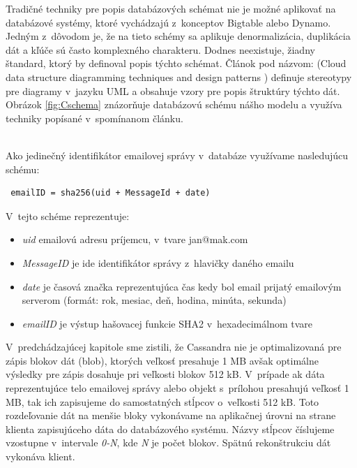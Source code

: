 \documentclass[11pt,twoside,a4paper]{book}
\begin{document}
Tradičné techniky pre popis databázových schémat nie je možné aplikovať na databázové systémy, ktoré vychádzajú z~konceptov Bigtable alebo Dynamo. Jedným z~dôvodom je, že na tieto schémy sa aplikuje denormalizácia, duplikácia dát a kľúče sú často komplexného charakteru. Dodnes neexistuje, žiadny štandard, ktorý by definoval popis týchto schémat. Článok pod názvom:  (Cloud data structure diagramming techniques and design patterns \cite{CloudDataStructureDiag}) definuje stereotypy pre diagramy v~jazyku UML a obsahuje vzory pre popis štruktúry týchto dát. Obrázok \ref{fig:Cschema} znázorňuje databázovú schému nášho modelu a využíva techniky popísané v~spomínanom článku.

\noindent
\\
Ako jedinečný identifikátor emailovej správy v~databáze využívame nasledujúcu schému:
\begin{verbatim}
 emailID = sha256(uid + MessageId + date)
\end{verbatim}

\noindent
V~tejto schéme reprezentuje:
\begin{itemize}
 \item \emph{uid} emailovú adresu príjemcu, v~tvare jan@mak.com
 \item \emph{MessageID} je ide identifikátor správy z~hlavičky daného emailu
 \item \emph{date} je časová značka reprezentujúca čas kedy bol email prijatý emailovým serverom (formát: rok, mesiac, deň, hodina, minúta, sekunda)
 \item \emph{emailID} je výstup hašovacej funkcie SHA2 v~hexadecimálnom tvare
\end{itemize}


V~predchádzajúcej kapitole sme zistili, že Cassandra nie je optimalizovaná pre zápis blokov dát (blob), ktorých veľkosť presahuje 1 MB avšak optimálne výsledky pre zápis dosahuje pri veľkosti blokov 512 kB. V~prípade ak dáta reprezentujúce telo emailovej správy alebo objekt s~prílohou presahujú veľkosť 1 MB, tak ich zapisujeme do samostatných stĺpcov o~veľkosti 512 kB. Toto rozdeľovanie dát na menšie bloky vykonávame na aplikačnej úrovni na strane klienta zapisujúceho dáta do databázového systému. Názvy stĺpcov číslujeme vzostupne v~intervale \emph{0-N}, kde \emph{N} je počet blokov. Spätnú rekonštrukciu dát vykonáva klient.
\end{document}
